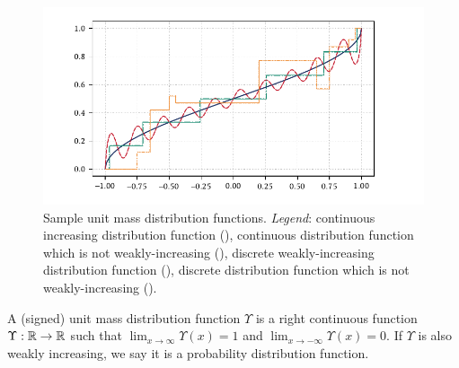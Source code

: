 \begin{figure}[htb]
    \begin{center}
        \includegraphics{imgs/ch2_sample_dist.pdf} 
    \end{center}
    \caption[Sample unit mass distribution functions.]{%
    Sample unit mass distribution functions.
    \hspace{.25em}\emph{Legend}:
    continuous increasing distribution function ({\protect{}}),
    continuous distribution function which is not weakly-increasing ({\protect{}}),
    discrete weakly-increasing distribution function ({\protect{}}),
    discrete distribution function which is not weakly-increasing ({\protect{}}).
    }
    \label{fig:ch2_sample_dist}
\end{figure}


\begin{definition}
A (signed) unit mass distribution function \( \Upsilon \) is a right continuous function \( \Upsilon:\mathbb{R}\to\mathbb{R} \) such that \( \lim_{x\to\infty} \Upsilon(x) = 1 \) and \( \lim_{x\to-\infty} \Upsilon(x) = 0 \).
If \( \Upsilon \) is also weakly increasing, we say it is a probability distribution function.
\end{definition}

